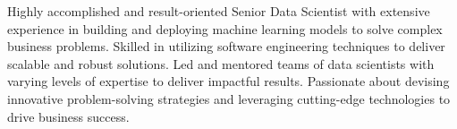 

\begin{cvparagraph}

Highly accomplished and result-oriented Senior Data Scientist with extensive experience in building and deploying machine learning models to solve complex business problems. Skilled in utilizing software engineering techniques to deliver scalable and robust solutions. Led and mentored teams of data scientists with varying levels of expertise to deliver impactful results. Passionate about devising innovative problem-solving strategies and leveraging cutting-edge technologies to drive business success.
\end{cvparagraph}
